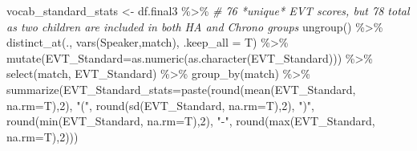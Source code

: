 \documentclass[
]{article}
\newenvironment{Shaded}{\begin{snugshade}}{\end{snugshade}}
\newcommand{\AttributeTok}[1]{\textcolor[rgb]{0.77,0.63,0.00}{#1}}
\newcommand{\CommentTok}[1]{\textcolor[rgb]{0.56,0.35,0.01}{\textit{#1}}}
\newcommand{\DecValTok}[1]{\textcolor[rgb]{0.00,0.00,0.81}{#1}}
\newcommand{\FunctionTok}[1]{\textcolor[rgb]{0.00,0.00,0.00}{#1}}
\newcommand{\NormalTok}[1]{#1}
\newcommand{\OtherTok}[1]{\textcolor[rgb]{0.56,0.35,0.01}{#1}}
\newcommand{\SpecialCharTok}[1]{\textcolor[rgb]{0.00,0.00,0.00}{#1}}
\newcommand{\StringTok}[1]{\textcolor[rgb]{0.31,0.60,0.02}{#1}}
\begin{document}
\begin{Shaded}
\begin{Highlighting}[]
\NormalTok{vocab\_standard\_stats }\OtherTok{\textless{}{-}}\NormalTok{ df.final3 }\SpecialCharTok{\%\textgreater{}\%} \CommentTok{\# 76 *unique* EVT scores, but 78 total as two children are included in both HA and Chrono groups }
  \FunctionTok{ungroup}\NormalTok{() }\SpecialCharTok{\%\textgreater{}\%}
  \FunctionTok{distinct\_at}\NormalTok{(., }\FunctionTok{vars}\NormalTok{(Speaker,match), }\AttributeTok{.keep\_all =}\NormalTok{ T) }\SpecialCharTok{\%\textgreater{}\%}
  \FunctionTok{mutate}\NormalTok{(}\AttributeTok{EVT\_Standard=}\FunctionTok{as.numeric}\NormalTok{(}\FunctionTok{as.character}\NormalTok{(EVT\_Standard))) }\SpecialCharTok{\%\textgreater{}\%}
  \FunctionTok{select}\NormalTok{(match, EVT\_Standard) }\SpecialCharTok{\%\textgreater{}\%}
  \FunctionTok{group\_by}\NormalTok{(match) }\SpecialCharTok{\%\textgreater{}\%}
  \FunctionTok{summarize}\NormalTok{(}\AttributeTok{EVT\_Standard\_stats=}\FunctionTok{paste}\NormalTok{(}\FunctionTok{round}\NormalTok{(}\FunctionTok{mean}\NormalTok{(EVT\_Standard, }\AttributeTok{na.rm=}\NormalTok{T),}\DecValTok{2}\NormalTok{),}
                                \StringTok{"("}\NormalTok{,}
                                \FunctionTok{round}\NormalTok{(}\FunctionTok{sd}\NormalTok{(EVT\_Standard, }\AttributeTok{na.rm=}\NormalTok{T),}\DecValTok{2}\NormalTok{),}
                                \StringTok{")"}\NormalTok{,}
                                \FunctionTok{round}\NormalTok{(}\FunctionTok{min}\NormalTok{(EVT\_Standard, }\AttributeTok{na.rm=}\NormalTok{T),}\DecValTok{2}\NormalTok{),}
                                \StringTok{"{-}"}\NormalTok{,}
                                \FunctionTok{round}\NormalTok{(}\FunctionTok{max}\NormalTok{(EVT\_Standard, }\AttributeTok{na.rm=}\NormalTok{T),}\DecValTok{2}\NormalTok{)))}


\end{Highlighting}
\end{Shaded}
\end{document}
